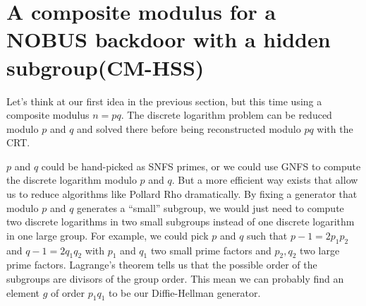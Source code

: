 \documentclass[a4paper,11pt,twocolumn]{article}
\begin{document}
\section{A composite modulus for a NOBUS backdoor with a hidden subgroup(CM-HSS)}

Let's think at our first idea in the previous section, but this time using a composite modulus $n=pq$. The discrete logarithm problem can be reduced modulo $p$ and $q$ and solved there before being reconstructed modulo $pq$ with the CRT.

\begin{center}
\end{center}

$p$ and $q$ could be hand-picked as SNFS primes, or we could use GNFS to compute the discrete logarithm modulo $p$ and $q$. But a more efficient way exists that allow us to reduce algorithms like Pollard Rho dramatically. By fixing a generator that modulo $p$ and $q$ generates a ``small'' subgroup, we would just need to compute two discrete logarithms in two small subgroups instead of one discrete logarithm in one large group. For example, we could pick $p$ and $q$ such that $p-1 = 2p_1p_2$ and $q-1=2q_1q_2$ with $p_1$ and $q_1$ two small prime factors and $p_2, q_2$ two large prime factors. Lagrange's theorem tells us that the possible order of the subgroups are divisors of the group order. This mean we can probably find an element $g$ of order $p_1q_1$ to be our Diffie-Hellman generator.
\end{document}
